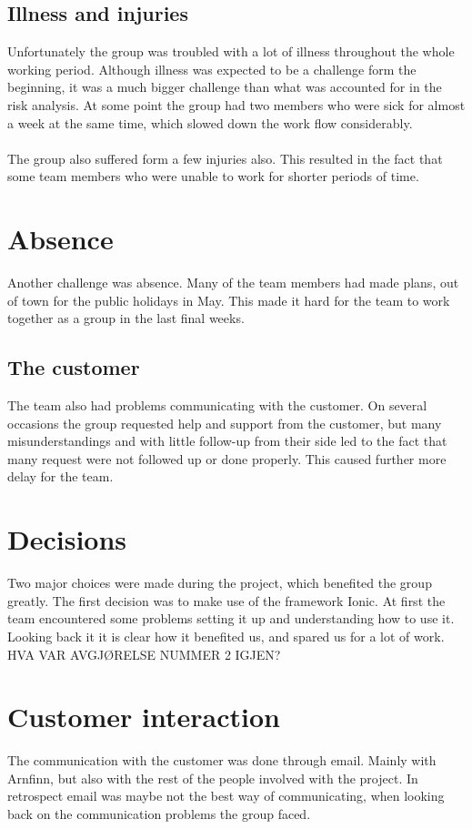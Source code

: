 \subsection {Illness and injuries}
Unfortunately the group was troubled with a lot of illness throughout the whole working period. Although illness was expected to be a challenge form the beginning, it was a much bigger challenge than what was accounted for in the risk analysis. At some point the group had two members who were sick for almost a week at the same time, which slowed down the work flow considerably. \\
\\
The group also suffered form a few injuries also. This resulted in the fact that some team members who were unable to work for shorter periods of time.

\section{Absence}
Another challenge was absence. Many of the team members had made plans, out of town for the public holidays in May. This made it hard for the team to work together as a group in the last final weeks. 

\subsection{The customer}
The team also had problems communicating with the customer. On several occasions the group requested help and support from the customer, but many misunderstandings and with little follow-up from their side led to the fact that many request were not followed up or done properly. This caused further more delay for the team.

\section{Decisions}
Two major choices were made during the project, which benefited the group greatly. The first decision was to make use of the framework Ionic. At first the team encountered some problems setting it up and understanding how to use it. Looking back it it is clear how it benefited us, and spared us for a lot of work. HVA VAR AVGJØRELSE NUMMER 2 IGJEN?

\section{Customer interaction}
The communication with the customer was done through email. Mainly with Arnfinn, but also with the rest of the people involved with the project. In retrospect email was maybe not the best way of communicating, when looking back on the communication problems the group faced. 

